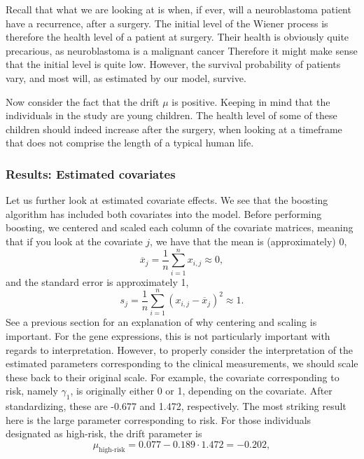 Recall that what we are looking at is when, if ever, will a neuroblastoma patient have a recurrence, after a surgery.
The initial level of the Wiener process is therefore the health level of a patient at surgery.
Their health is obviously quite precarious, as neuroblastoma is a malignant cancer
Therefore it might make sense that the initial level is quite low.
However, the survival probability of patients vary, and most will, as estimated by our model, survive.

Now consider the fact that the drift $\mu$ is positive.
Keeping in mind that the individuals in the study are young children.
The health level of some of these children should indeed increase after the surgery, when looking at a timeframe that does not comprise the length of a typical human life.

\subsubsection{Results: Estimated covariates}
Let us further look at estimated covariate effects.
We see that the boosting algorithm has included both covariates into the model.
Before performing boosting, we centered and scaled each column of the covariate matrices, meaning that if you look at the covariate $j$, we have that the mean is (approximately) 0,
\begin{equation}
    \overline{x}_j=\frac{1}{n}\sum_{i=1}^n x_{i,j}\approx 0,
\end{equation}
and the standard error is approximately 1,
\begin{equation}
    s_j=\frac{1}{n}\sum_{i=1}^n (x_{i,j}-\overline{x}_j)^2\approx 1.
\end{equation}
See a previous section for an explanation of why centering and scaling is important.
For the gene expressions, this is not particularly important with regards to interpretation.
However, to properly consider the interpretation of the estimated parameters corresponding to the clinical measurements, we should
scale these back to their original scale.
For example, the covariate corresponding to risk, namely $\gamma_1$, is originally either 0 or 1, depending on the covariate.
After standardizing, these are -0.677 and 1.472, respectively.
The most striking result here is the large parameter corresponding to risk.
For those individuals designated as high-risk, the drift parameter is
\begin{equation}
    \mu_{\text{high-risk}}=0.077-0.189\cdot1.472=-0.202,
\end{equation}
